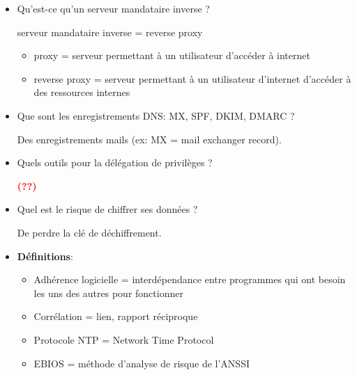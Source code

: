 \documentclass[a4paper]{article}
\begin{document}
\begin{itemize}
\newpage










\item Qu’est-ce qu’un serveur mandataire inverse ?
\begin{example}
    serveur mandataire inverse = reverse proxy
    \begin{itemize}
        \item proxy = serveur permettant à un utilisateur d'accéder à internet
        \item reverse proxy = serveur permettant à un utilisateur d'internet d'accéder à des ressources internes
    \end{itemize}
\end{example}





\item Que sont les enregistrements DNS: MX, SPF, DKIM, DMARC ?
\begin{example}
    Des enregistrements mails (ex: MX = mail exchanger record).
\end{example}





\item Quels outils pour la délégation de privilèges ?
\begin{example}
    \textcolor{red}{\textbf{(??)}}
\end{example}





\item Quel est le risque de chiffrer ses données ?
\begin{example}
    De perdre la clé de déchiffrement.
\end{example}





\item \textbf{Définitions}:
\begin{itemize}
    \item Adhérence logicielle = interdépendance entre programmes qui ont besoin les uns des autres pour fonctionner
    \item Corrélation = lien, rapport réciproque
    \item Protocole NTP = Network Time Protocol
    \item EBIOS = méthode d'analyse de risque de l'ANSSI
\end{itemize}





\end{itemize}
\end{document}
